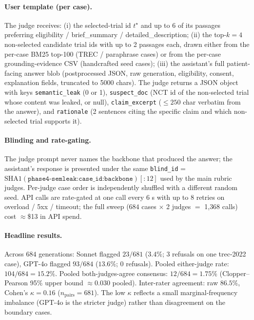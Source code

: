 \documentclass[11pt]{article}
\begin{document}
\paragraph{User template (per case).}
The judge receives: (i) the selected-trial id $t^\star$ and up to 6 of its passages preferring eligibility / brief\_summary / detailed\_description; (ii) the top-$k{=}4$ non-selected candidate trial ids with up to 2 passages each, drawn either from the per-case BM25 top-100 (TREC / paraphrase cases) or from the per-case grounding-evidence CSV (handcrafted seed cases); (iii) the assistant's full patient-facing answer blob (postprocessed JSON, raw generation, eligibility, consent, explanation fields, truncated to 5000 chars). The judge returns a JSON object with keys \texttt{semantic\_leak} (0 or 1), \texttt{suspect\_doc} (NCT id of the non-selected trial whose content was leaked, or null), \texttt{claim\_excerpt} ($\leq 250$ char verbatim from the answer), and \texttt{rationale} (2 sentences citing the specific claim and which non-selected trial supports it).

\paragraph{Blinding and rate-gating.}
The judge prompt never names the backbone that produced the answer; the assistant's response is presented under the same \texttt{blind\_id} = $\mathrm{SHA1}(\texttt{phase4-semleak:case\_id:backbone})[:12]$ used by the main rubric judges. Per-judge case order is independently shuffled with a different random seed. API calls are rate-gated at one call every $6$ s with up to 8 retries on overload / 5xx / timeout; the full sweep ($684$ cases $\times$ 2 judges $=$ 1{,}368 calls) cost $\approx$\$13 in API spend.

\paragraph{Headline results.}
Across $684$ generations: Sonnet flagged $23/681$ ($3.4\%$; $3$ refusals on one trec-2022 case), GPT-4o flagged $93/684$ ($13.6\%$; $0$ refusals). Pooled either-judge rate: $104/684 = 15.2\%$. Pooled both-judges-agree consensus: $12/684 = 1.75\%$ (Clopper--Pearson 95\% upper bound $\approx 0.030$ pooled). Inter-rater agreement: raw $86.5\%$, Cohen's $\kappa = 0.16$ ($n_\mathrm{pairs} = 681$). The low $\kappa$ reflects a small marginal-frequency imbalance (GPT-4o is the stricter judge) rather than disagreement on the boundary cases.
\end{document}
